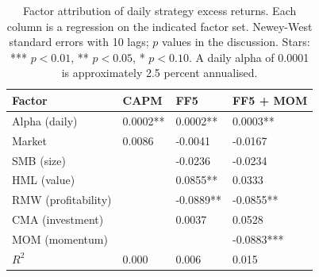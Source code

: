 \begin{table}[H]
\centering
\caption{Factor attribution of daily strategy excess returns. Each column is a regression on the indicated factor set. Newey-West standard errors with 10 lags; $p$ values in the discussion. Stars: *** $p<0.01$, ** $p<0.05$, * $p<0.10$. A daily alpha of 0.0001 is approximately 2.5 percent annualised.} 
\label{tab:factor_attr}
\begin{tabular}{llll}
  \toprule
Factor & CAPM & FF5 & FF5 + MOM \\ 
  \midrule
Alpha (daily) & 0.0002** & 0.0002** & 0.0003** \\ 
  Market & 0.0086 & -0.0041 & -0.0167 \\ 
  SMB (size) &  & -0.0236 & -0.0234 \\ 
  HML (value) &  & 0.0855** & 0.0333 \\ 
  RMW (profitability) &  & -0.0889** & -0.0855** \\ 
  CMA (investment) &  & 0.0037 & 0.0528 \\ 
  MOM (momentum) &  &  & -0.0883*** \\ 
  $R^2$ & 0.000 & 0.006 & 0.015 \\ 
   \bottomrule
\end{tabular}
\end{table}
